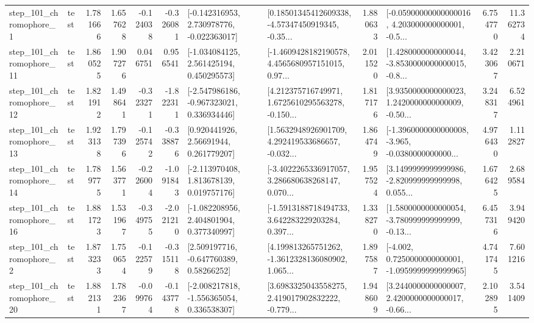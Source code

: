 \begin{tabular}{llrrrrllrlrr}
   step\_101\_chromophore\_1 &      test &      1.781666 &    1.657628 &     -0.124038 & -0.326081 &   [-0.142316953, 2.730978776, -0.022363017] &  [0.18501345412609338, -4.57347450919345, -0.35... &       1.880633 &  [-0.05900000000000016, 4.203000000000001, -0.5... &            6.754770 &         11.362734 \\
  step\_101\_chromophore\_11 &      test &      1.860525 &    1.907276 &      0.046751 &  0.956541 &    [-1.034084125, 2.561425194, 0.450295573] &  [-1.4609428182190578, 4.4565680957151015, 0.97... &       2.011520 &  [1.4280000000000044, -3.8530000000000015, -0.8... &            3.423067 &          2.210671 \\
  step\_101\_chromophore\_12 &      test &      1.821912 &    1.498641 &     -0.323271 & -1.822311 &   [-2.547986186, -0.967323021, 0.336934446] &  [4.212375716749971, 1.6725610295563278, -0.150... &       1.817176 &  [3.9350000000000023, 1.2420000000000009, -0.50... &            3.248317 &          6.524961 \\
  step\_101\_chromophore\_13 &      test &      1.923138 &    1.797396 &     -0.125742 & -0.338876 &      [0.920441926, 2.56691944, 0.261779207] &  [1.5632948926901709, 4.292419533686657, -0.032... &       1.864749 &  [-1.3960000000000008, -3.965, -0.0380000000000... &            4.976430 &          1.112827 \\
  step\_101\_chromophore\_14 &      test &      1.789775 &    1.563771 &     -0.226004 & -1.091843 &    [-2.113970408, 1.813678139, 0.019757176] &  [-3.4022265336917057, 3.286680638268147, 0.070... &       1.957524 &  [3.1499999999999986, -2.820999999999998, 0.055... &            1.676425 &          2.689584 \\
  step\_101\_chromophore\_16 &      test &      1.881723 &    1.531967 &     -0.349755 & -2.021210 &    [-1.082208956, 2.404801904, 0.377340997] &  [-1.5913188718494733, 3.642283229203284, 0.397... &       1.338270 &  [1.5800000000000054, -3.780999999999999, -0.13... &            6.457316 &          3.949420 \\
   step\_101\_chromophore\_2 &      test &      1.873233 &    1.750654 &     -0.122579 & -0.315118 &     [2.509197716, -0.647760389, 0.58266252] &  [4.199813265751262, -1.3612328136080902, 1.065... &       1.897587 &  [-4.002, 0.7250000000000001, -1.0959999999999965] &            4.741745 &          7.601216 \\
  step\_101\_chromophore\_20 &      test &      1.882131 &    1.782367 &     -0.099764 & -0.143778 &   [-2.008217818, -1.556365054, 0.336538307] &  [3.6983325043558275, 2.419017902832222, -0.779... &       1.948609 &  [3.2440000000000007, 2.4200000000000017, -0.66... &            2.102895 &          3.541409 \\

\end{tabular}
